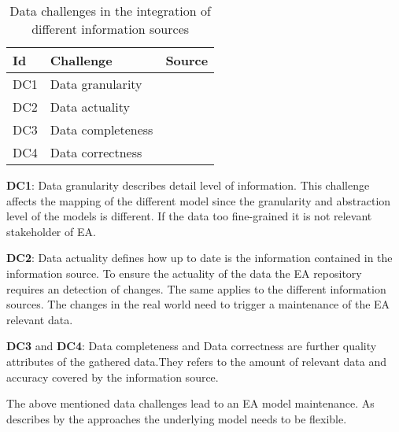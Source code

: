 \begin{table}[htpb]
  \caption[Data challenges in the integration of different information sources]{Data challenges in the integration of different information sources}\label{tab:data-challenges}
  \centering
  \begin{tabular}{l l l}
    \toprule
      Id & Challenge & Source\\
    \midrule
      DC1 & Data granularity &\cite{Hauder2012}\cite{Farwick2013}\cite{Roth2013}\cite{Holm2014}\cite{Valja2015}\\
      DC2 & Data actuality &\cite{Hauder2012}\cite{Farwick2013}\cite{Roth2013}\cite{Holm2014}\cite{Valja2015}\cite{Johnson2016}\cite{Landthaler2018}\cite{Bogner2016}\\
      DC3 & Data completeness &\cite{Hauder2012}\cite{Farwick2013}\cite{Roth2013}\cite{Holm2014}\cite{Valja2015}\\
      DC4 & Data correctness &\cite{Hauder2012}\cite{Farwick2013}\cite{Roth2013}\cite{Holm2014}\cite{Valja2015}\cite{Johnson2016}\cite{Landthaler2018}\\
    \bottomrule
  \end{tabular}
\end{table}

\textbf{DC1}: Data granularity describes detail level of information. This challenge affects the mapping of the different model since the granularity and abstraction level of the models is different. If the data too fine-grained it is not relevant stakeholder of EA.

\textbf{DC2}: Data actuality defines how up to date is the information contained in the information source. To ensure the actuality of the data the EA repository requires an detection of changes. The same applies to the different information sources. The changes in the real world need to trigger a maintenance of the EA relevant data.

\textbf{DC3} and \textbf{DC4}: Data completeness and Data correctness are further quality attributes of the gathered data.They refers to the amount of relevant data  and accuracy covered by the information source.

The above mentioned data challenges lead to an EA model maintenance. As describes by the approaches the underlying model needs to be flexible.

